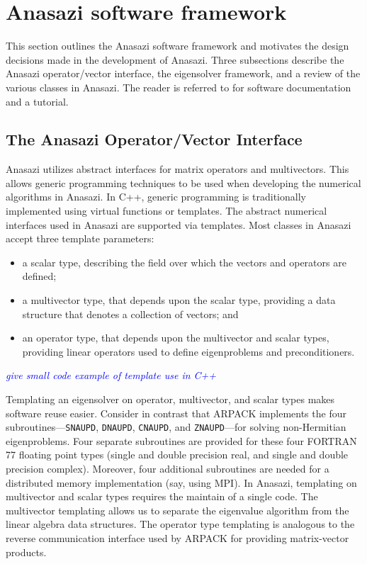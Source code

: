 \documentclass[acmtoms]{acmtrans2m}
\newcounter{algorithm}
\newcommand{\cbcomm}[1]{\textcolor{blue}{\emph{#1}}}
\begin{document}
\section{Anasazi software framework}
\label{sec:framework}

This section outlines the Anasazi software framework and motivates
the design decisions made in the development of Anasazi. Three
subsections describe the Anasazi operator/vector interface, the
eigensolver framework, and a review of the various classes in
Anasazi. The reader is referred to
\cite{Trilinos:anasazi,Trilinos-Tutorial} for software documentation
and a tutorial.

\subsection{The Anasazi Operator/Vector Interface}
\label{sec:anasazi:opvec}

Anasazi utilizes abstract interfaces for matrix operators and
multivectors. This allows generic programming techniques to be used
when developing the numerical algorithms in Anasazi. In C++, generic
programming is traditionally implemented using virtual
functions or templates. The abstract numerical interfaces used
in Anasazi are supported via templates. Most classes in Anasazi accept
three template parameters:
\begin{itemize}
\item
a scalar type, describing the field over which the vectors and
operators are defined;
\item
a multivector type, that depends upon the scalar type, providing a
data structure that denotes a collection of vectors; and
\item
an operator type, that depends upon the multivector and scalar types,
providing linear operators used to define eigenproblems and
preconditioners.
\end{itemize}

\cbcomm{give small code example of template use in C++}

Templating an eigensolver on operator, multivector, and scalar types
makes software reuse easier. Consider in contrast that ARPACK implements
the four subroutines---\texttt{SNAUPD}, \texttt{DNAUPD},
\texttt{CNAUPD}, and \texttt{ZNAUPD}---for solving non-Hermitian
eigenproblems. Four separate subroutines are provided for these four
FORTRAN 77 floating point types (single and double precision real, and
single and double precision complex). Moreover, four additional
subroutines are needed for a distributed memory implementation (say,
using MPI). In Anasazi, templating on multivector and scalar types
requires the maintain of a single code. The multivector templating
allows us to separate the eigenvalue algorithm from the linear algebra
data structures. The operator type templating is analogous to the
reverse communication interface used by ARPACK for providing
matrix-vector products.
\end{document}
